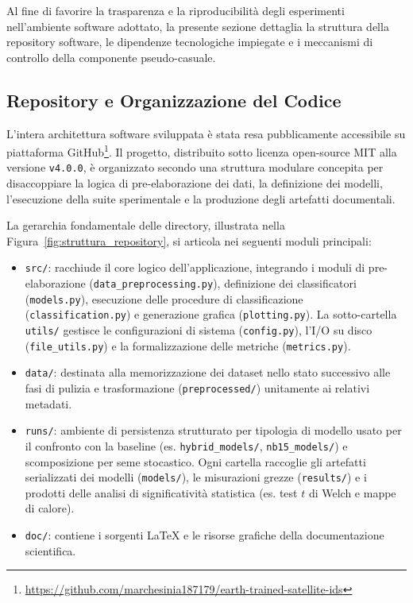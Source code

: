 Al fine di favorire la trasparenza e la riproducibilità degli esperimenti nell'ambiente software adottato, la presente sezione dettaglia la struttura della repository software, le dipendenze tecnologiche impiegate e i meccanismi di controllo della componente pseudo-casuale.

\subsection{Repository e Organizzazione del Codice}
\label{subsec:repository}

L'intera architettura software sviluppata è stata resa pubblicamente accessibile su piattaforma GitHub\footnote{\url{https://github.com/marchesinia187179/earth-trained-satellite-ids}}. 
Il progetto, distribuito sotto licenza open-source MIT alla versione \texttt{v4.0.0}, è organizzato secondo una struttura modulare concepita per disaccoppiare la logica di pre-elaborazione dei dati, la definizione dei modelli, l'esecuzione della suite sperimentale e la produzione degli artefatti documentali.

La gerarchia fondamentale delle directory, illustrata nella Figura~\ref{fig:struttura_repository}, si articola nei seguenti moduli principali:
\begin{itemize}
    \item \texttt{src/}: racchiude il core logico dell'applicazione, integrando i moduli di pre-elaborazione (\texttt{data\_preprocessing.py}), definizione dei classificatori (\texttt{models.py}), esecuzione delle procedure di classificazione (\texttt{classification.py}) e generazione grafica (\texttt{plotting.py}). La sotto-cartella \texttt{utils/} gestisce le configurazioni di sistema (\texttt{config.py}), l'I/O su disco (\texttt{file\_utils.py}) e la formalizzazione delle metriche (\texttt{metrics.py}).
    \item \texttt{data/}: destinata alla memorizzazione dei dataset nello stato successivo alle fasi di pulizia e trasformazione (\texttt{preprocessed/}) unitamente ai relativi metadati.
    \item \texttt{runs/}: ambiente di persistenza strutturato per tipologia di modello usato per il confronto con la baseline (es. \texttt{hybrid\_models/}, \texttt{nb15\_models/}) e scomposizione per seme stocastico. Ogni cartella raccoglie gli artefatti serializzati dei modelli (\texttt{models/}), le misurazioni grezze (\texttt{results/}) e i prodotti delle analisi di significatività statistica (es. test $t$ di Welch e mappe di calore).
    \item \texttt{doc/}: contiene i sorgenti \LaTeX{} e le risorse grafiche della documentazione scientifica.
\end{itemize}

